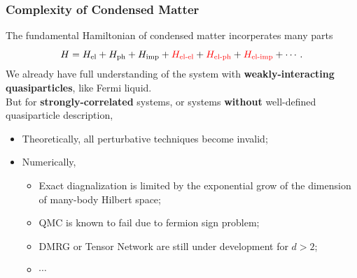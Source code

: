 \documentclass[10pt,aspectratio=43,xcolor=x11names,t]{beamer}%
\begin{document}
		\begin{frame}\frametitle{Complexity of Condensed Matter}
			The fundamental Hamiltonian of condensed matter incorperates many parts
			\begin{equation*}
				H=H_{\text{el}}+H_{\text{ph}}+H_{\text{imp}}+{\color{red}H_{\text{el-el}}}+{\color{red}H_{\text{el-ph}}}+{\color{red}H_{\text{el-imp}}}+\cdots.
			\end{equation*}
			We already have full understanding of the system with \textbf{weakly-interacting quasiparticles}, like Fermi liquid.\pause\\[1em]
			But for \textbf{strongly-correlated} systems, or systems \textbf{without} well-defined quasiparticle description,
			\begin{itemize}
				\item Theoretically, all perturbative techniques become invalid;
				\item Numerically, 
				\begin{itemize}
					\item Exact diagnalization is limited by the exponential grow of the dimension of many-body Hilbert space;
					\item QMC is known to fail due to fermion sign problem;
					\item DMRG or Tensor Network are still under development for $d>2$;
					\item $\cdots$
				\end{itemize}
			\end{itemize}
		\end{frame}
\end{document}

